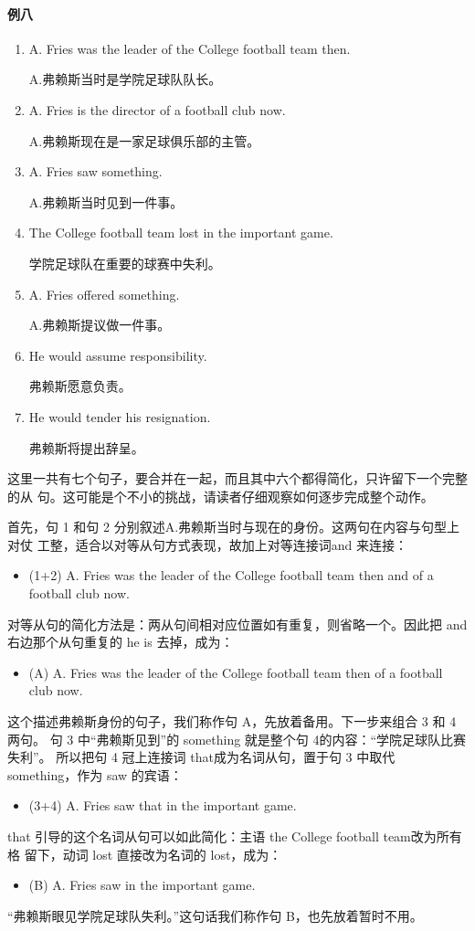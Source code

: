 \paragraph{例八}

\begin{enumerate}
\item A. Fries was the leader of the College football team then.

  A.弗赖斯当时是学院足球队队长。
\item A. Fries is the director of a football club now.

  A.弗赖斯现在是一家足球俱乐部的主管。
\item A. Fries saw something.

  A.弗赖斯当时见到一件事。
\item The College football team lost in the important game.

  学院足球队在重要的球赛中失利。
\item A. Fries offered something.

  A.弗赖斯提议做一件事。
\item He would assume responsibility.

  弗赖斯愿意负责。
\item He would tender his resignation.

  弗赖斯将提出辞呈。
\end{enumerate}

这里一共有七个句子，要合并在一起，而且其中六个都得简化，只许留下一个完整的从
句。这可能是个不小的挑战，请读者仔细观察如何逐步完成整个动作。

首先，句 1 和句 2 分别叙述A.弗赖斯当时与现在的身份。这两句在内容与句型上对仗
工整，适合以对等从句方式表现，故加上对等连接词and 来连接：
\begin{itemize}
\item (1+2) A. Fries was the leader of the College football team then and
   of a football club now.
\end{itemize}
对等从句的简化方法是：两从句间相对应位置如有重复，则省略一个。因此把 and
右边那个从句重复的 he is 去掉，成为：
\begin{itemize}
\item (A) A. Fries was the leader of the College football team then  of a football club now.
\end{itemize}
这个描述弗赖斯身份的句子，我们称作句 A，先放着备用。下一步来组合 3 和 4两句。
句 3 中“弗赖斯见到”的 something 就是整个句 4的内容：“学院足球队比赛失利”。
所以把句 4 冠上连接词 that成为名词从句，置于句 3 中取代 something，作为 saw
的宾语：
\begin{itemize}
\item (3+4) A. Fries saw that  in the important
  game.
\end{itemize}
that 引导的这个名词从句可以如此简化：主语 the College football team改为所有格
留下，动词 lost 直接改为名词的 lost，成为：
\begin{itemize}
\item (B) A. Fries saw  in the important
  game.
\end{itemize}
“弗赖斯眼见学院足球队失利。”这句话我们称作句 B，也先放着暂时不用。

